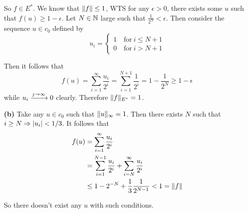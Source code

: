 \documentclass[a4paper, 10pt]{article}
\begin{document}
\begin{solution}
    So $f \in E^*$. We know that $\lVert f\rVert \leq 1$, WTS for any $\epsilon > 0$, there exists some $u$ such that $f(u) \geq 1 - \epsilon$. Let $N \in \mathbb{N}$ large such that $\frac{1}{2^N} < \epsilon$. Then consider the sequence $u \in c_0$ defined by \begin{equation*}
    u_i = \begin{cases}
        1 & \:\text{for}\: i \leq N+1 \\
        0 & \:\text{for}\:  i > N+1
    \end{cases}
    \end{equation*}

    Then it follows that \begin{equation*}
    f(u) = \sum_{i=1}^{\infty} \frac{u_i}{2^i} = \sum_{i=1}^{N+1} \frac{1}{2^i} = 1 - \frac{1}{2^{N}} \geq 1 - \epsilon
    \end{equation*}
    while $u_i \xrightarrow{j \to \infty} 0$ clearly. Therefore $\lVert f\rVert_{E^*} = 1$.

    \textbf{(b)} Take any $u \in c_0$ such that $\lVert u\rVert_{\infty} = 1$. Then there exists $N$ such that $i \geq N \Rightarrow \lvert u_i\rvert < 1/3$. It follows that \begin{align*}
        f(u) &= \sum_{i=1}^{\infty} \frac{u_i}{2^i} \\
        &= \sum_{i=1}^{N-1} \frac{u_i}{2^i} + \sum_{i=N}^{\infty} \frac{u_i}{2^i} \\
        &\leq 1 - 2^{-N} + \frac{1}{3} \frac{1}{2^{N-1}} < 1 =\lVert f\rVert
    \end{align*}

    So there doesn't exist any $u$ with such conditions.
\end{solution}
\end{document}
